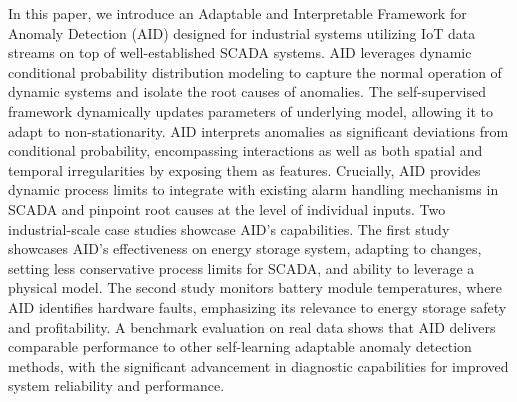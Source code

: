 In this paper, we introduce an Adaptable and Interpretable Framework for Anomaly Detection (AID) designed for industrial systems utilizing IoT data streams on top of well-established SCADA systems. AID leverages dynamic conditional probability distribution modeling to capture the normal operation of dynamic systems and isolate the root causes of anomalies. The self-supervised framework dynamically updates parameters of underlying model, allowing it to adapt to non-stationarity. AID interprets anomalies as significant deviations from conditional probability, encompassing interactions as well as both spatial and temporal irregularities by exposing them as features. Crucially, AID provides dynamic process limits to integrate with existing alarm handling mechanisms in SCADA and pinpoint root causes at the level of individual inputs. Two industrial-scale case studies showcase AID's capabilities. The first study showcases AID's effectiveness on energy storage system, adapting to changes, setting less conservative process limits for SCADA, and ability to leverage a physical model. The second study monitors battery module temperatures, where AID identifies hardware faults, emphasizing its relevance to energy storage safety and profitability. A benchmark evaluation on real data shows that AID delivers comparable performance to other self-learning adaptable anomaly detection methods, with the significant advancement in diagnostic capabilities for improved system reliability and performance.